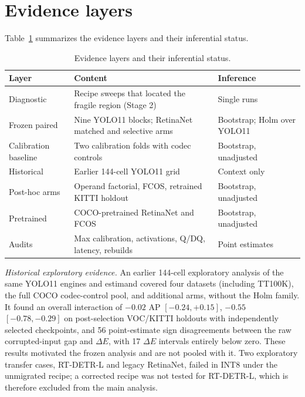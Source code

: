 \documentclass[10pt]{article}
\begin{document}
\section{Evidence layers}

Table~\ref{tab:evidence-layers} summarizes the evidence layers and their
inferential status.

\begin{table}[h]
\centering\small
\caption{Evidence layers and their inferential status.}
\label{tab:evidence-layers}
\begin{tabular}{@{}>{\raggedright\arraybackslash}p{}>{\raggedright\arraybackslash}p{}>{\raggedright\arraybackslash}p{}@{}}
\toprule
Layer & Content & Inference \\
\midrule
Diagnostic & Recipe sweeps that located the fragile region (Stage 2) & Single runs \\
Frozen paired & Nine YOLO11 blocks; RetinaNet matched and selective arms & Bootstrap; Holm over YOLO11 \\
Calibration baseline & Two calibration folds with codec controls & Bootstrap, unadjusted \\
Historical & Earlier 144-cell YOLO11 grid & Context only \\
Post-hoc arms & Operand factorial, FCOS, retrained KITTI holdout & Bootstrap, unadjusted \\
Pretrained & COCO-pretrained RetinaNet and FCOS & Bootstrap, unadjusted \\
Audits & Max calibration, activations, Q/DQ, latency, rebuilds & Point estimates \\
\bottomrule
\end{tabular}
\end{table}

\emph{Historical exploratory evidence.} An earlier 144-cell exploratory
analysis of the same YOLO11 engines and estimand covered four datasets
(including TT100K), the full COCO codec-control pool, and additional arms,
without the Holm family. It found an overall interaction of $-0.02$ AP
$[-0.24,+0.15]$, $-0.55$ $[-0.78,-0.29]$ on post-selection VOC/KITTI
holdouts with independently selected checkpoints, and 56 point-estimate sign
disagreements between the raw corrupted-input gap and $\Delta E$, with 17
$\Delta E$ intervals entirely below zero. These results motivated the frozen
analysis and are not pooled with it. Two exploratory transfer cases,
RT-DETR-L and legacy RetinaNet, failed in INT8 under the unmigrated recipe; a
corrected recipe was not tested for RT-DETR-L, which is therefore excluded
from the main analysis.
\end{document}
